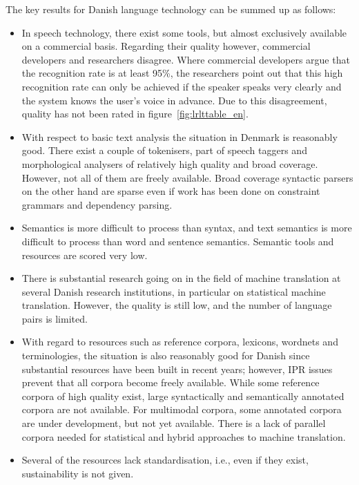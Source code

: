 \begin{multicols}{2}
The key results for Danish language technology can be summed up as follows:

\begin{itemize}
\item In speech technology, there exist some tools, but almost exclusively available on a commercial basis. Regarding their quality however, commercial developers and researchers disagree. Where commercial developers argue that the recognition rate is at least 95\%, the researchers point out that this high recognition rate can only be achieved if the speaker speaks very clearly and the system knows the user's voice in advance. Due to this disagreement, quality has not been rated in figure~\ref{fig:lrlttable_en}.
\item With respect to basic text analysis the situation in Denmark is reasonably good. There exist a couple of tokenisers, part of speech taggers and morphological analysers of relatively high quality and broad coverage.  However, not all of them are freely available. Broad coverage syntactic parsers on the other hand are sparse even if work has been done on constraint grammars and dependency parsing.
\item Semantics is more difficult to process than syntax, and text semantics is more difficult to process than word and sentence semantics. Semantic tools and resources are scored very low. 
\item There is substantial research going on in the field of machine translation at several Danish research institutions, in particular on statistical machine translation. However, the quality is still low, and the number of language pairs is limited.
\item With regard to resources such as reference corpora, lexicons, wordnets and terminologies, the situation is also reasonably good for Danish since substantial resources have been built in recent years; however, IPR issues prevent that all corpora become freely available. While some reference corpora of high quality exist, large syntactically and semantically annotated corpora are not available. For multimodal corpora, some annotated corpora are under development, but not yet available. There is a lack of parallel corpora needed for statistical and hybrid approaches to machine translation.
\item Several of the resources lack standardisation, i.e., even if they exist, sustainability is not given.
\end{itemize}


\end{multicols}
